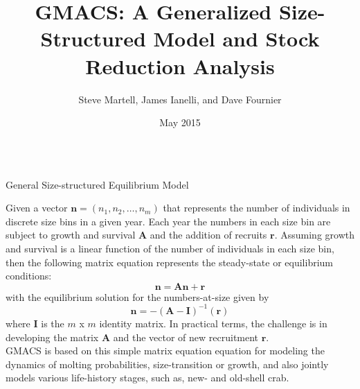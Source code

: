 \documentclass[final]{beamer} %
\title[\url{https://github.com/seacode/gmacs}]{GMACS: A Generalized Size-Structured Model and Stock Reduction Analysis}
\author[Martell et al.]{Steve Martell, James Ianelli, and Dave Fournier}
\institute[IPHC]{International Pacific Halibut Commission, Alaska Fisheries Science Center, and Otter Research}
\date[Photo Credit: S. Isachenko]{May 2015}
\begin{document}
  \begin{frame}{} 
    \begin{columns}[t]
      
      \begin{column}{.3\linewidth}
        \vspace{6.5in}
        
        \begin{block}{\large General Size-structured Equilibrium Model}


          Given a vector $\bm{n} = (n_1,n_2,\ldots,n_m)$ that represents the number of individuals in discrete
          size bins in a given year.  Each year the numbers in each size bin are subject to 
          growth and survival $\bm{A}$ and the addition of recruits $\bm{r}$.
          Assuming growth and survival is a linear function of the number of 
          individuals in each size bin, then the following matrix equation represents
          the steady-state or equilibrium conditions:
          \[\bm{n} = \bm{A}\bm{n} + \bm{r}\]
          with the equilibrium solution for the numbers-at-size given by
          \[\bm{n} = -(\bm{A} - \bm{I})^{-1} (\bm{r})\]
          where $\bm{I}$ is the $m$ x $m$ identity matrix. In practical terms, the 
          challenge is in developing the matrix $\bm{A}$ and the vector of new recruitment
          $\bm{r}$.\\[1ex]

          GMACS is based on this simple matrix equation equation for modeling the dynamics of molting probabilities, size-transition or growth, and also jointly models various life-history stages, such as, new- and old-shell crab.


\end{block}
\end{column}
\end{columns}
\end{frame}
\end{document}

